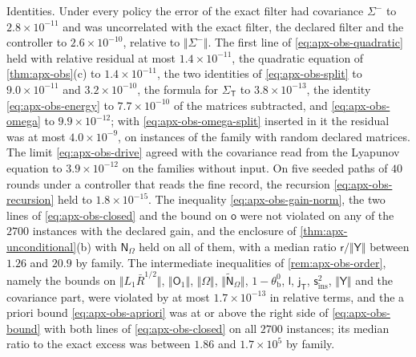\begin{numcheck}
Identities. Under every policy the error of the exact filter had covariance $\Sigma^-$ to $2.8\times10^{-11}$ and was uncorrelated with the exact filter, the declared filter and the controller to $2.6\times10^{-10}$, relative to $\Vert\Sigma^-\Vert$. The first line of \eqref{eq:apx-obs-quadratic} held with relative residual at most $1.4\times10^{-11}$, the quadratic equation of \cref{thm:apx-obs}(c) to $1.4\times10^{-11}$, the two identities of \eqref{eq:apx-obs-split} to $9.0\times10^{-11}$ and $3.2\times10^{-10}$, the formula for $\Sigma_{\mathsf T}$ to $3.8\times10^{-13}$, the identity \eqref{eq:apx-obs-energy} to $7.7\times10^{-10}$ of the matrices subtracted, and \eqref{eq:apx-obs-omega} to $9.9\times10^{-12}$; with \eqref{eq:apx-obs-omega-split} inserted in it the residual was at most $4.0\times10^{-9}$, on instances of the family with random declared matrices. The limit \eqref{eq:apx-obs-drive} agreed with the covariance read from the Lyapunov equation to $3.9\times10^{-12}$ on the families without input. On five seeded paths of $40$ rounds under a controller that reads the fine record, the recursion \eqref{eq:apx-obs-recursion} held to $1.8\times10^{-15}$. The inequality \eqref{eq:apx-obs-gain-norm}, the two lines of \eqref{eq:apx-obs-closed} and the bound on $\mathsf o$ were not violated on any of the $2700$ instances with the declared gain, and the enclosure of \cref{thm:apx-unconditional}(b) with $\mathsf N_\Omega$ held on all of them, with a median ratio $\mathsf r/\Vert\mathsf Y\Vert$ between $1.26$ and $20.9$ by family. The intermediate inequalities of \cref{rem:apx-obs-order}, namely the bounds on $\Vert L_1\bar R^{1/2}\Vert$, $\Vert\mathsf O_1\Vert$, $\Vert\Omega\Vert$, $\Vert\tilde{\mathsf N}_\Omega\Vert$, $1-\theta^0_{\mathrm b}$, $\mathsf l$, $\mathsf j_{\mathsf T}$, $\mathsf s_{\mathrm{ins}}^2$, $\Vert\mathsf Y\Vert$ and the covariance part, were violated by at most $1.7\times10^{-13}$ in relative terms, and the a priori bound \eqref{eq:apx-obs-apriori} was at or above the right side of \eqref{eq:apx-obs-bound} with both lines of \eqref{eq:apx-obs-closed} on all $2700$ instances; its median ratio to the exact excess was between $1.86$ and $1.7\times10^5$ by family.


\end{numcheck}
